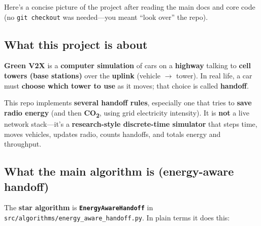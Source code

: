 \documentclass[11pt,a4paper]{article}
\begin{document}
\begin{assistmsg}
Here's a concise picture of the project after reading the main docs and core code (no \texttt{git checkout} was needed—you meant ``look over'' the repo).

\subsection*{What this project is about}

\textbf{Green V2X} is a \textbf{computer simulation} of cars on a \textbf{highway} talking to \textbf{cell towers (base stations)} over the \textbf{uplink} (vehicle $\rightarrow$ tower). In real life, a car must \textbf{choose which tower to use} as it moves; that choice is called \textbf{handoff}.

This repo implements \textbf{several handoff rules}, especially one that tries to \textbf{save radio energy} (and then \textbf{CO\textsubscript{2}}, using grid electricity intensity). It is \textbf{not} a live network stack---it's a \textbf{research-style discrete-time simulator} that steps time, moves vehicles, updates radio, counts handoffs, and totals energy and throughput.

\subsection*{What the main algorithm is (energy-aware handoff)}

The \textbf{star algorithm} is \textbf{\texttt{EnergyAwareHandoff}} in \texttt{src/algorithms/energy\_aware\_handoff.py}. In plain terms it does this:


\end{assistmsg}
\end{document}
